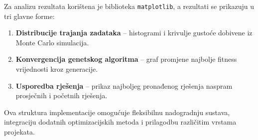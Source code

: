 Za analizu rezultata korištena je biblioteka \texttt{matplotlib}, a rezultati se prikazuju u tri glavne forme:
\begin{enumerate}
    \item \textbf{Distribucije trajanja zadataka} -- histogrami i krivulje gustoće dobivene iz Monte Carlo simulacija.
    \item \textbf{Konvergencija genetskog algoritma} -- graf promjene najbolje fitness vrijednosti kroz generacije.
    \item \textbf{Usporedba rješenja} -- prikaz najboljeg pronađenog rješenja naspram prosječnih i početnih rješenja.
\end{enumerate}

Ova struktura implementacije omogućuje fleksibilnu nadogradnju sustava, integraciju dodatnih optimizacijskih metoda i prilagodbu različitim vrstama projekata.
